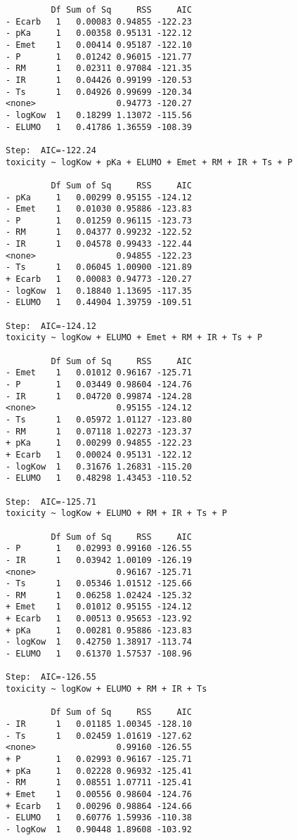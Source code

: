 \documentclass[11pt]{article}
\begin{document}
\begin{enumerate}
\begin{verbatim}
         Df Sum of Sq     RSS     AIC
- Ecarb   1   0.00083 0.94855 -122.23
- pKa     1   0.00358 0.95131 -122.12
- Emet    1   0.00414 0.95187 -122.10
- P       1   0.01242 0.96015 -121.77
- RM      1   0.02311 0.97084 -121.35
- IR      1   0.04426 0.99199 -120.53
- Ts      1   0.04926 0.99699 -120.34
<none>                0.94773 -120.27
- logKow  1   0.18299 1.13072 -115.56
- ELUMO   1   0.41786 1.36559 -108.39

Step:  AIC=-122.24
toxicity ~ logKow + pKa + ELUMO + Emet + RM + IR + Ts + P

         Df Sum of Sq     RSS     AIC
- pKa     1   0.00299 0.95155 -124.12
- Emet    1   0.01030 0.95886 -123.83
- P       1   0.01259 0.96115 -123.73
- RM      1   0.04377 0.99232 -122.52
- IR      1   0.04578 0.99433 -122.44
<none>                0.94855 -122.23
- Ts      1   0.06045 1.00900 -121.89
+ Ecarb   1   0.00083 0.94773 -120.27
- logKow  1   0.18840 1.13695 -117.35
- ELUMO   1   0.44904 1.39759 -109.51

Step:  AIC=-124.12
toxicity ~ logKow + ELUMO + Emet + RM + IR + Ts + P

         Df Sum of Sq     RSS     AIC
- Emet    1   0.01012 0.96167 -125.71
- P       1   0.03449 0.98604 -124.76
- IR      1   0.04720 0.99874 -124.28
<none>                0.95155 -124.12
- Ts      1   0.05972 1.01127 -123.80
- RM      1   0.07118 1.02273 -123.37
+ pKa     1   0.00299 0.94855 -122.23
+ Ecarb   1   0.00024 0.95131 -122.12
- logKow  1   0.31676 1.26831 -115.20
- ELUMO   1   0.48298 1.43453 -110.52

Step:  AIC=-125.71
toxicity ~ logKow + ELUMO + RM + IR + Ts + P

         Df Sum of Sq     RSS     AIC
- P       1   0.02993 0.99160 -126.55
- IR      1   0.03942 1.00109 -126.19
<none>                0.96167 -125.71
- Ts      1   0.05346 1.01512 -125.66
- RM      1   0.06258 1.02424 -125.32
+ Emet    1   0.01012 0.95155 -124.12
+ Ecarb   1   0.00513 0.95653 -123.92
+ pKa     1   0.00281 0.95886 -123.83
- logKow  1   0.42750 1.38917 -113.74
- ELUMO   1   0.61370 1.57537 -108.96

Step:  AIC=-126.55
toxicity ~ logKow + ELUMO + RM + IR + Ts

         Df Sum of Sq     RSS     AIC
- IR      1   0.01185 1.00345 -128.10
- Ts      1   0.02459 1.01619 -127.62
<none>                0.99160 -126.55
+ P       1   0.02993 0.96167 -125.71
+ pKa     1   0.02228 0.96932 -125.41
- RM      1   0.08551 1.07711 -125.41
+ Emet    1   0.00556 0.98604 -124.76
+ Ecarb   1   0.00296 0.98864 -124.66
- ELUMO   1   0.60776 1.59936 -110.38
- logKow  1   0.90448 1.89608 -103.92


\end{verbatim}
\end{enumerate}
\end{document}
